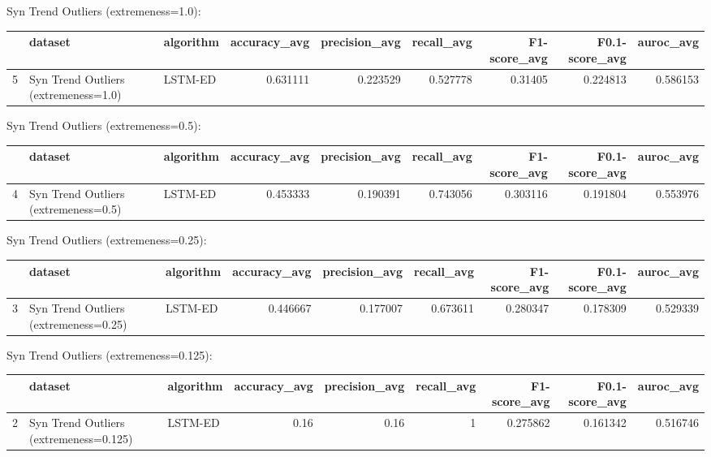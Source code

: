 Syn Trend Outliers (extremeness=1.0):

\begin{tabular}{rllrrrrrr}
\hline
    & dataset                              & algorithm   &   accuracy\_avg &   precision\_avg &   recall\_avg &   F1-score\_avg &   F0.1-score\_avg &   auroc\_avg \\
\hline
  5 & Syn Trend Outliers (extremeness=1.0) & LSTM-ED     &       0.631111 &        0.223529 &     0.527778 &        0.31405 &         0.224813 &    0.586153 \\
\hline
\end{tabular}

Syn Trend Outliers (extremeness=0.5):

\begin{tabular}{rllrrrrrr}
\hline
    & dataset                              & algorithm   &   accuracy\_avg &   precision\_avg &   recall\_avg &   F1-score\_avg &   F0.1-score\_avg &   auroc\_avg \\
\hline
  4 & Syn Trend Outliers (extremeness=0.5) & LSTM-ED     &       0.453333 &        0.190391 &     0.743056 &       0.303116 &         0.191804 &    0.553976 \\
\hline
\end{tabular}

Syn Trend Outliers (extremeness=0.25):

\begin{tabular}{rllrrrrrr}
\hline
    & dataset                               & algorithm   &   accuracy\_avg &   precision\_avg &   recall\_avg &   F1-score\_avg &   F0.1-score\_avg &   auroc\_avg \\
\hline
  3 & Syn Trend Outliers (extremeness=0.25) & LSTM-ED     &       0.446667 &        0.177007 &     0.673611 &       0.280347 &         0.178309 &    0.529339 \\
\hline
\end{tabular}

Syn Trend Outliers (extremeness=0.125):

\begin{tabular}{rllrrrrrr}
\hline
    & dataset                                & algorithm   &   accuracy\_avg &   precision\_avg &   recall\_avg &   F1-score\_avg &   F0.1-score\_avg &   auroc\_avg \\
\hline
  2 & Syn Trend Outliers (extremeness=0.125) & LSTM-ED     &           0.16 &            0.16 &            1 &       0.275862 &         0.161342 &    0.516746 \\
\hline
\end{tabular}

